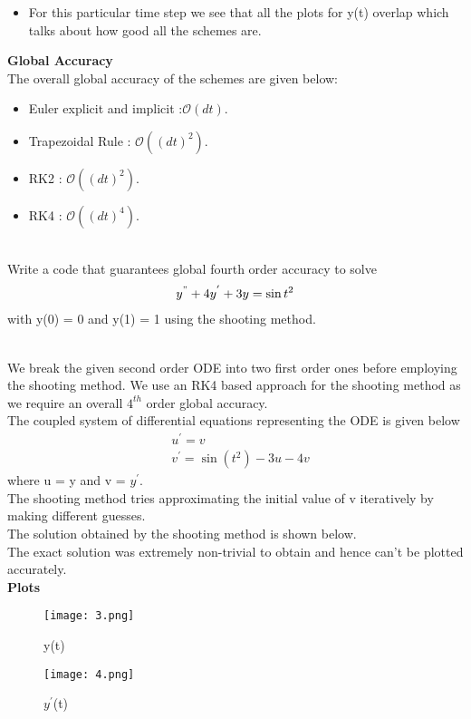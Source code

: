 \documentclass[letterpaper]{exam}
\begin{document}
\begin{questions}
\begin{solution}
\begin{itemize}
    \item For this particular time step we see that all the plots for y(t) overlap which talks about how good all the schemes are.
\end{itemize}
\textbf{Global Accuracy}\\
The overall global accuracy of the schemes are given below:
\begin{itemize}
    \item Euler explicit and implicit :$\mathcal{O}(dt)$.
    \item Trapezoidal Rule : $\mathcal{O}((dt)^2)$.
    \item RK2 : $\mathcal{O}((dt)^2)$.
    \item RK4 : $\mathcal{O}((dt)^4)$.
\end{itemize}
\end{solution}
\\
Write a code that guarantees global fourth order accuracy to solve
\begin{align*}
    y^{"} + 4y^{'} +3y = \sin{t^2}
\end{align*}
with y(0) = 0 and y(1) = 1 using the shooting method.
\begin{solution}
\\
We break the given second order ODE into two first order ones before employing the shooting method. We use an RK4 based approach for the shooting method as we require an overall $4^{th}$ order global accuracy.\\
The coupled system of differential equations representing the ODE is given below
\begin{align}
    &u^{'} = v\\
    &v^{'} = \sin{(t^2)} -3u -4v
\end{align}
where u = y and v = $y^{'}$.\\
The shooting method tries approximating the initial value of v iteratively by making different guesses.\\
The solution obtained by the shooting method is shown below.\\
The exact solution was extremely non-trivial to obtain and hence can't be plotted accurately.\\
\textbf{Plots}
\begin{figure}[H]  
     \centering
    \texttt{[image: 3.png]}
     \label{fig:Dendrogram for the problem 3(c)}
     \caption{y(t)}
\end{figure}
\begin{figure}[H]  
     \centering
    \texttt{[image: 4.png]}
     \label{fig:Dendrogram for the problem 3(c)}
     \caption{$y^{'}$(t)}
\end{figure}
\end{solution}
\end{questions}
\end{document}
